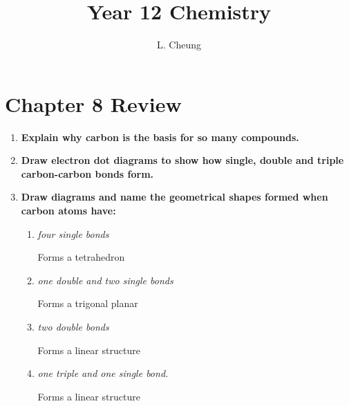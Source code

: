 \documentclass{report}
\title{\Huge Year 12 Chemistry}
\author{L. Cheung}
\begin{document}

	\DeclareSIUnit{\molar}{\mole\per\liter}
	\DeclareSIUnit{\enthalpy}{\kJ\per\mole}
	\maketitle
	\tableofcontents
	\newpage

\section{Chapter 8 Review}

	\begin{enumerate}
		\item \textbf{Explain why carbon is the basis for so many compounds.}
		    \subitem 
		\item \textbf{Draw electron dot diagrams to show how single, double and triple carbon-carbon bonds form.}
		    
		\item \textbf{Draw diagrams and name the geometrical shapes formed when carbon atoms have:}
		\begin{enumerate}
			\item \textit{four single bonds}
				\begin{center}
				\end{center}

				Forms a tetrahedron

			\item \textit{one double and two single bonds}
				\begin{center}
				\end{center}

				Forms a trigonal planar

			\item \textit{two double bonds}
				\begin{center}
				\end{center}

				Forms a linear structure

			\item \textit{one triple and one single bond.}
				\begin{center}
				\end{center}

				Forms a linear structure

		\end{enumerate}
		    

\end{enumerate}
\end{document}
